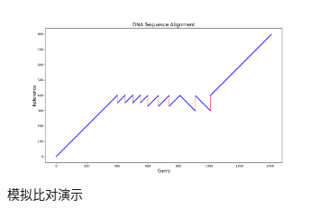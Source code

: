 \documentclass[12pt, a4paper, oneside]{ctexart}
\begin{document}
    \begin{figure}[htbp]
        \centering
        \includegraphics[width=0.8\textwidth]{演示图像.png}
        \caption{模拟比对演示}
    \end{figure}


		
\end{document}

